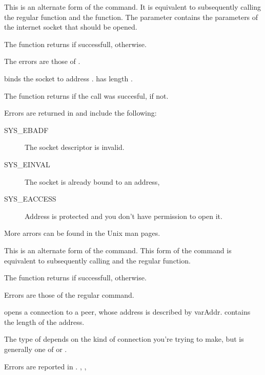 { This is an alternate form of the  command. 
It is equivalent
to subsequently calling the regular  function and the 
 function.
The  parameter contains the parameters of the internet socket that
should be opened.

The function returns  if successfull,  otherwise.
}
{The errors are those of .}
{}

{ binds the socket  to address . 
has length .

The function returns  if the call was succesful,  if
not.
}
{Errors are returned in  and include the following:
\begin{description}
\item[SYS\_EBADF] The socket descriptor is invalid.
\item[SYS\_EINVAL] The socket is already bound to an address,
\item[SYS\_EACCESS] Address is protected and you don't have permission to
open it.
\end{description}
More arrors can be found in the Unix man pages.
}{}

{This is an alternate form of the  command.
This form of the  command is equivalent to subsequently 
calling  and the regular  function.

The function returns  if successfull,  otherwise.
}
{Errors are those of the regular  command.}
{}

{ opens a connection to a peer, whose address is described by
var{Addr}.  contains the length of the address.

The type of  depends on the kind of connection you're trying to
make, but is generally one of  or .
}
{Errors are reported in .}
{, ,}

\html{}


